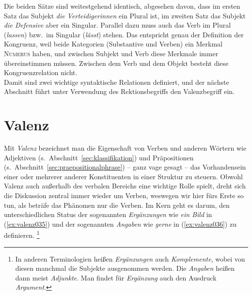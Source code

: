 Die beiden Sätze sind weitestgehend identisch, abgesehen davon, dass im ersten Satz das Subjekt \textit{die Verteidigerinnen} ein Plural ist, im zweiten Satz das Subjekt \textit{die Defensive} aber ein Singular.
Parallel dazu muss auch das Verb im Plural (\textit{lassen}) bzw.\ im Singular (\textit{lässt}) stehen.
Das entspricht genau der Definition der Kongruenz, weil beide Kategorien (Substantive und Verben) ein Merkmal \textsc{Numerus} haben, und zwischen Subjekt und Verb diese Merkmale immer übereinstimmen müssen.
Zwischen dem Verb und dem Objekt besteht diese Kongruenzrelation nicht.\\
Damit sind zwei wichtige syntaktische Relationen definiert, und der nächste Abschnitt führt unter Verwendung des Rektionsbegriffs den Valenzbegriff ein.


\section{Valenz}
\label{sec:valenz}


Mit \textit{Valenz} bezeichnet man die Eigenschaft von Verben und anderen Wörtern wie Adjektiven (s.\ Abschnitt~\ref{sec:klassifikation}) und Präpositionen (s.\ Abschnitt~\ref{sec:praepositionalphrase}) -- ganz vage gesagt -- das Vorhandensein einer oder mehrerer anderer Konstituenten in einer Struktur zu steuern.
Obwohl Valenz auch außerhalb des verbalen Bereichs eine wichtige Rolle spielt, dreht sich die Diskussion zentral immer wieder um Verben, weswegen wir hier fürs Erste so tun, als beträfe das Phänomen nur die Verben.
Im Kern geht es darum, den unterschiedlichen Status der sogenannten \textit{Ergänzungen} wie \textit{ein Bild} in (\ref{ex:valenz035}) und der sogenannten \textit{Angaben} wie \textit{gerne} in (\ref{ex:valenz036}) zu definieren.%
\footnote{In anderen Terminologien heißen \textit{Ergänzungen} auch \textit{Komplemente}, wobei von diesen manchmal die Subjekte ausgenommen werden.
Die \textit{Angaben} heißen dann meist \textit{Adjunkte}.
Man findet für \textit{Ergänzung} auch den Ausdruck \textit{Argument}.
}

